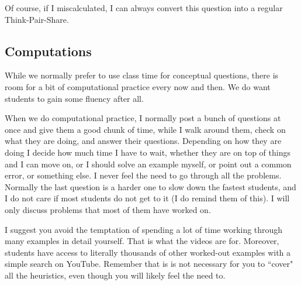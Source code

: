 \documentclass[11pt]{article}
\begin{document}
\begin{example}
\begin{comments}
{Of course, if I miscalculated, I can always convert this question into a regular Think-Pair-Share.}

\end{comments}
\end{example}

\newpage

\subsection{Computations}
{\baselineskip
While we normally prefer to use class time for conceptual questions, there is room for a bit of computational practice every now and then.  We do want students to gain some fluency after all.  

When we do computational practice, I normally post a bunch of questions at once and give them a good chunk of time, while I walk around them, check on what they are doing, and answer their questions.  Depending on how they are doing I decide how much time I have to wait, whether they are on top of things and I can move on, or I should solve an example myself, or point out a common error, or something else.  I never feel the need to go through all the problems.  Normally the last question is a harder one to slow down the fastest students, and I do not care if most students do not get to it (I do remind them of this).   I will only discuss problems that most of them have worked on.

I suggest you avoid the temptation of spending a lot of time working through many examples  in detail yourself.  That is what the videos are for.  Moreover, students have access to literally thousands of other worked-out examples with a simple search on YouTube.  Remember that is is not necessary for you to ``cover" all the heuristics, even though you will likely feel the need to.\\
}
\end{document}
